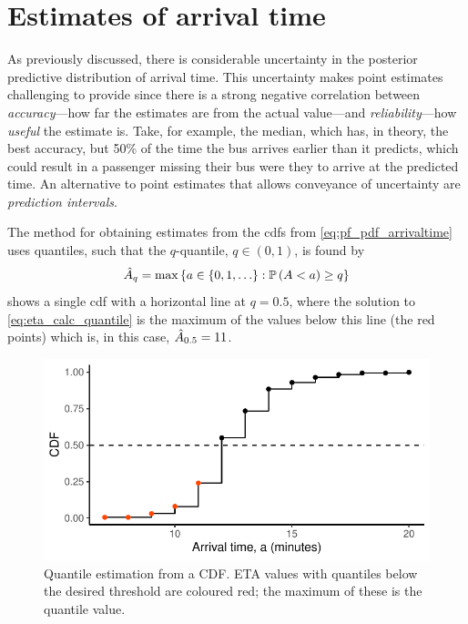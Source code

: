 \section{Estimates of arrival time}
\label{sec:eta_estimates}

As previously discussed, there is considerable uncertainty in the posterior predictive distribution of arrival time. This uncertainty makes point estimates challenging to provide since there is a strong negative correlation between \emph{accuracy}---how far the estimates are from the actual value---and \emph{reliability}---how \emph{useful} the estimate is. Take, for example, the median, which has, in theory, the best accuracy, but 50\% of the time the bus arrives earlier than it predicts, which could result in a passenger missing their bus were they to arrive at the predicted time. An alternative to point estimates that allows conveyance of uncertainty are \emph{prediction intervals}.

The method for obtaining estimates from the \glspl{cdf} from \cref{eq:pf_pdf_arrivaltime} uses quantiles, such that the $q$-quantile, $q\in(0,1)$, is found by
\begin{equation}
\label{eq:eta_calc_quantile}
\hat{A}_q = \max\left\{a \in \{0, 1, \ldots\} : \mathbb{P}\left(A < a\right) \geq q\right\}
\end{equation}
 shows a single \gls{cdf} with a horizontal line at $q = 0.5$, where the solution to \cref{eq:eta_calc_quantile} is the maximum of the values below this line (the red points) which is, in this case, $\hat{A}_{0.5} = 11$.


\begin{knitrout}\small
{}\color{fgcolor}\begin{figure}

{\centering \includegraphics[width=.6\textwidth]{figure/eta_calc_quantile-1} 

}

\caption[Quantile estimation from a CDF]{Quantile estimation from a CDF. ETA values with quantiles below the desired threshold are coloured red; the maximum of these is the quantile value.}\label{fig:eta_calc_quantile}
\end{figure}


\end{knitrout}




